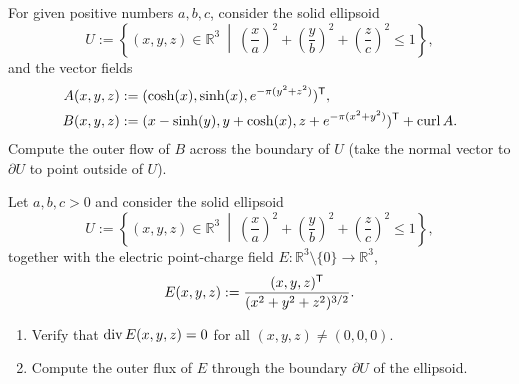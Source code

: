 \begin{exercise}
\label{ex:examHS24_KP1_part2_flux}
For given positive numbers $a, b, c$, consider the solid ellipsoid
\[ U := \left\{(x,y,z) \in \mathbb{R}^3 \ \middle|\ \left(\frac{x}{a}\right)^2 + \left(\frac{y}{b}\right)^2 + \left(\frac{z}{c}\right)^2 \le 1\right\}, \]
and the vector fields
\begin{align*}
  A(x,y,z) &:= (\cosh(x), \sinh(x), e^{-\pi(y^2+z^2)})^{\mathsf{T}}, \\
  B(x,y,z) &:= (x - \sinh(y), y + \cosh(x), z + e^{-\pi(x^2+y^2)})^{\mathsf{T}} + \operatorname{curl} A.
\end{align*}
Compute the outer flow of $B$ across the boundary of $U$ (take the normal vector to $\partial U$ to point outside of $U$).
\end{exercise}

\begin{exercise}
\label{ex:gauss_law_ellipsoid_flux}
Let $a,b,c > 0$ and consider the solid ellipsoid
\[U := \left\{(x,y,z) \in \mathbb{R}^3 \ \middle|\ \left(\frac{x}{a}\right)^2 + \left(\frac{y}{b}\right)^2 + \left(\frac{z}{c}\right)^2 \leq 1\right\},\]
together with the electric point-charge field $E : \mathbb{R}^3 \setminus \{0\} \to \mathbb{R}^3$,
\[E(x,y,z) := \frac{(x,y,z)^{\mathsf{T}}}{(x^2+y^2+z^2)^{3/2}}.\]
\begin{enumerate}[label=\textbf{(\alph*)}]
  \item Verify that $\operatorname{div} E(x,y,z) = 0$ for all $(x,y,z) \neq (0,0,0)$.
  \item Compute the outer flux of $E$ through the boundary $\partial U$ of the ellipsoid.
\end{enumerate}
\end{exercise}

